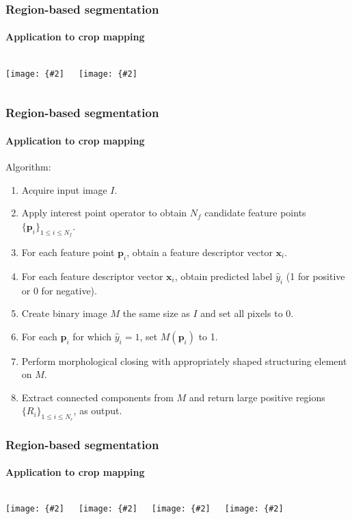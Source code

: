 \documentclass[aspectratio=169]{beamer}
\renewcommand{\vec}[1]{\boldsymbol{#1}}
\newcommand{\myfig}[3]{\centerline{\texttt{[image: \{\#2]}}}
\begin{document}
\begin{frame}
\frametitle{Region-based segmentation}
\framesubtitle{Application to crop mapping}

\begin{columns}

\column{2.2in}

\myfig{2in}{system_overview}{Fruit detection system}

\column{2.2in}

\myfig{2in}{flow_pine_210_keyall}{Extracting
  feature points from agricultural image.}

\end{columns}

\end{frame}


\begin{frame}
\frametitle{Region-based segmentation}
\framesubtitle{Application to crop mapping}

Algorithm:
\begin{enumerate}
\item Acquire input image $I$.
\item Apply interest point operator to obtain $N_f$ candidate feature
  points $\{\vec{p}_i\}_{1 \le i \le N_f}$.
\item For each feature point $\vec{p}_i$, obtain a feature descriptor
  vector $\vec{x}_i$.
\item For each feature descriptor vector $\vec{x}_i$, obtain predicted
  label $\hat{y}_i$ (1 for positive or 0 for negative).
\item Create binary image $M$ the same size as $I$ and set all pixels
  to 0.
\item For each $\vec{p}_i$ for which
  $\hat{y}_i = 1$, set $M(\vec{p}_i)$ to 1.
\item Perform morphological closing with appropriately shaped
  structuring element on $M$.
\item Extract connected components from $M$ and return large positive
  regions $\{R_i\}_{1 \le i \le N_r}$, as output.
\end{enumerate}

\end{frame}


\begin{frame}
\frametitle{Region-based segmentation}
\framesubtitle{Application to crop mapping}

\begin{columns}

\column{2.2in}

\myfig{1.5in}{flow_pine_210_keypos}{Predicted positive feature points}

\medskip

\myfig{1.5in}{flow_pine_210_close}{Filtering results}

\column{2.2in}

\myfig{1.5in}{flow_pine_210_compbig}{Connected components results}

\medskip

\myfig{1.5in}{flow_pine_210_rec}{Detected regions}

\end{columns}

\end{frame}
\end{document}
